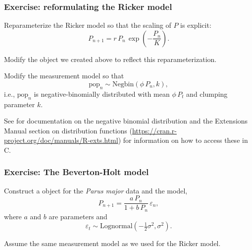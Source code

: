 \documentclass{beamer}\usepackage[]{graphicx}\usepackage[]{color}
\begin{document}
\begin{frame}

\frametitle{Exercise: reformulating the Ricker model}
\bi
\item Reparameterize the Ricker model so that the scaling of $P$ is explicit:
$$P_{n+1} = r\,P_{n}\,\exp\left(-\frac{P_{n}}{K}\right).$$

\item Modify the  object we created above to reflect this reparameterization.

\item Modify the measurement model so that
$$\mathrm{pop}_n \sim \mathrm{Negbin}(\phi\,P_n,k),$$
i.e., $\mathrm{pop}_n$ is negative-binomially distributed with mean $\phi\,P_t$ and clumping parameter $k$.

\item See  for documentation on the negative binomial distribution and the {\R} Extensions Manual section on distribution functions (\url{https://cran.r-project.org/doc/manuals/R-exts.html}) for information on how to access these in C.

\ei

\end{frame}

\begin{frame}[fragile]

\frametitle{Exercise: The Beverton-Holt model}

\bi

\item Construct a  object for the {\it Parus major} data and the  model,
$$P_{n+1} = \frac{a\,P_n}{1+b\,P_n}\,\varepsilon_n,$$
where $a$ and $b$ are parameters and
$$\varepsilon_t \sim \mathrm{Lognormal}(-\tfrac{1}{2}\sigma^2,\sigma^2).$$

\item Assume the same measurement model as we used for the Ricker model.

\ei

\end{frame} 
\end{document}
